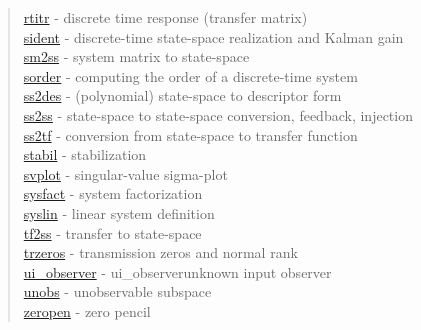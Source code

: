 \begin{quote}
\hyperlink{rtitr}{rtitr} - {discrete time response (transfer matrix)  } \\  
\hyperlink{sident}{sident} - {discrete-time state-space realization and Kalman gain} \\  
\hyperlink{sm2ss}{sm2ss} - {system matrix to state-space} \\  
\hyperlink{sorder}{sorder} - {computing the order of a discrete-time system} \\  
\hyperlink{ss2des}{ss2des} - {(polynomial) state-space to descriptor form} \\  
\hyperlink{ss2ss}{ss2ss} - {state-space to state-space conversion, feedback, injection} \\  
\hyperlink{ss2tf}{ss2tf} - {conversion from state-space to transfer function} \\  
\hyperlink{stabil}{stabil} - {stabilization} \\  
\hyperlink{svplot}{svplot} - {singular-value sigma-plot} \\  
\hyperlink{sysfact}{sysfact} - {system factorization} \\  
\hyperlink{syslin}{syslin} - {linear system definition} \\  
\hyperlink{tf2ss}{tf2ss} - {transfer to state-space} \\  
\hyperlink{trzeros}{trzeros} - {transmission zeros and normal rank} \\  
\hyperlink{ui_observer}{ui\_observer} - {ui_observer}{unknown input observer} \\  
\hyperlink{unobs}{unobs} - {unobservable subspace} \\  
\hyperlink{zeropen}{zeropen} - {zero pencil}
\end{quote}


